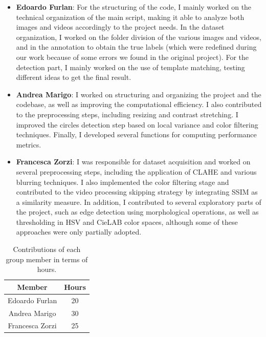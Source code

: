 \begin{itemize}
    \item \textbf{Edoardo Furlan}: For the structuring of the code, I mainly worked on the technical organization of the main script, making it able to analyze both images and videos accordingly to the project needs. In the dataset organization, I worked on the folder division of the various images and videos, and in the annotation to obtain the true labels (which were redefined during our work because of some errors we found in the original project). For the detection part, I mainly worked on the use of template matching, testing different ideas to get the final result.
    \item \textbf{Andrea Marigo}: I worked on structuring and organizing the project and the codebase, as well as improving the computational efficiency. I also contributed to the preprocessing steps, including resizing and contrast stretching. I improved the circles detection step based on local variance and color filtering techniques. Finally, I developed several functions for computing performance metrics.
    \item \textbf{Francesca Zorzi}: I was responsible for dataset acquisition and worked on several preprocessing steps, including the application of CLAHE and various blurring techniques. I also implemented the color filtering stage and contributed to the video processing skipping strategy by integrating SSIM as a similarity measure. In addition, I contributed to several exploratory parts of the project, such as edge detection using morphological operations, as well as thresholding in HSV and CieLAB color spaces, although some of these approaches were only partially adopted.
\end{itemize}

\begin{table}[h!]
    \centering
    \begin{tabular}{c|c}
        \hline
        \textbf{Member} & \textbf{Hours} \\
        \hline
        Edoardo Furlan & 20  \\
        Andrea Marigo & 30 \\
        Francesca Zorzi & 25 \\
        \hline
    \end{tabular}
    \caption{Contributions of each group member in terms of hours.}
    \label{tab:contributions}
\end{table}